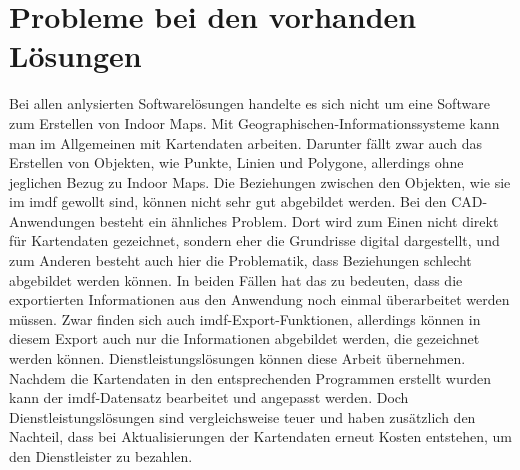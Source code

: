 \section{Probleme bei den vorhanden Lösungen}
Bei allen anlysierten Softwarelösungen handelte es sich nicht um eine Software zum Erstellen von Indoor Maps.
Mit Geographischen-Informationssysteme kann man im Allgemeinen mit Kartendaten arbeiten.
Darunter fällt zwar auch das Erstellen von Objekten, wie Punkte, Linien und Polygone, allerdings ohne jeglichen Bezug zu Indoor Maps.
Die Beziehungen zwischen den Objekten, wie sie im \acl{imdf} gewollt sind, können nicht sehr gut abgebildet werden.
Bei den CAD-Anwendungen besteht ein ähnliches Problem.
Dort wird zum Einen nicht direkt für Kartendaten gezeichnet, sondern eher die Grundrisse digital dargestellt, und zum Anderen besteht auch hier die Problematik, dass Beziehungen schlecht abgebildet werden können.\pbreak%
%
In beiden Fällen hat das zu bedeuten, dass die exportierten Informationen aus den Anwendung noch einmal überarbeitet werden müssen.
Zwar finden sich auch \ac{imdf}-Export-Funktionen, allerdings können in diesem Export auch nur die Informationen abgebildet werden, die gezeichnet werden können.\pbreak%
%
Dienstleistungslösungen können diese Arbeit übernehmen.
Nachdem die Kartendaten in den entsprechenden Programmen erstellt wurden kann der \ac{imdf}-Datensatz bearbeitet und angepasst werden.
Doch Dienstleistungslösungen sind vergleichsweise teuer und haben zusätzlich den Nachteil, dass bei Aktualisierungen der Kartendaten erneut Kosten entstehen, um den Dienstleister zu bezahlen.
